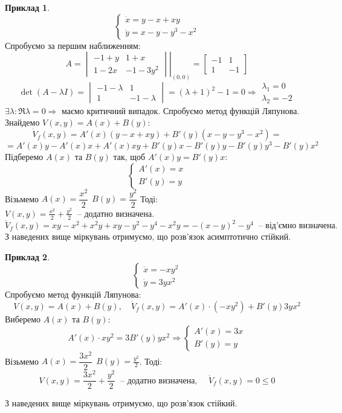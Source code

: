 \documentclass[14pt,a4paper]{scrartcl}
\theoremstyle{definition}
\newtheorem*{example}{Приклад}
\theoremstyle{definition}
\theoremstyle{definition}
\begin{document}
\begin{example}
 $$
 \begin{cases}
\dot{x} = y-x+xy\\
\dot{y} = x-y-y^3 -x^2
 \end{cases}
 $$
 Спробуємо за першим наближенням:
 $$
 A = \left. \begin{vmatrix}
  -1+y & 1 + x \\
  1 - 2x & -1-3y^2
 \end{vmatrix} \right|_{(0,0)} = \begin{bmatrix}
  -1 & 1 \\
  1 & -1
 \end{bmatrix}
 $$
 $$
 \det(A - \lambda I) = \begin{vmatrix}
   -1 - \lambda & 1 \\
   1 & -1-\lambda
 \end{vmatrix} = (\lambda + 1)^2  - 1 = 0 \Rightarrow \begin{gathered}
  \lambda_1 = 0 \\
  \lambda_2 = -2
 \end{gathered}
 $$
 $\exists \lambda : \Re \lambda = 0 \Longrightarrow $ маємо критичний випадок. Спробуємо метод функцій Ляпунова. Знайдемо $V(x,y) = A(x) + B(y)$:
$$
\dot{V}_f (x,y) = A'(x)(y-x+xy) + B'(y) (x-y-y^3 -x^2) =
$$
$$
= A'(x)y - A'(x)x + A'(x)xy + B'(y)x - B'(y)y - B'(y)y^3 - B'(y)x^2
$$
Підберемо $A(x)$ та $B(y)$ так, щоб $
A'(x)y = B'(y)x
$:
$$
\begin{cases}
 A'(x)  = x\\
 B'(y) = y
\end{cases}
$$
Візьмемо $A(x) = \dfrac{x^2}{2}\ \  B(y) = \dfrac{y^2}{2} $ Тоді: $V(x,y) = \frac{x^2}{2} + \frac{y^2}{2} \ \text{ -- додатно визначена.}$ $$\dot{V}_f (x,y) = xy - x^2 + x^2 y  + xy - y^2 - y^4 - x^2 y = -(x-y)^2 - y^4 \ \text{ -- від'ємно визначена.} $$
З наведених вище міркувань отримуємо, що розв'язок асимптотично стійкий.
\end{example}

\begin{example}
 $$
 \begin{cases}
  \dot{x } = -xy^2\\
  \dot{y} = 3yx^2
 \end{cases}
 $$
 Спробуємо метод функцій Ляпунова:
 $$
 V(x,y) = A(x) + B(y), \quad
 \dot{V}_f (x,y) = A'(x) \cdot (-xy^2) + B'(y) 3yx^2
 $$
 Виберемо $A(x)$ та $B(y)$:
 $$
 A'(x) \cdot xy^2 = 3 B'(y) yx^2 \Longrightarrow \begin{cases}
  A'(x)  = 3x\\
  B'(y) = y
 \end{cases}
 $$
Візьмемо $A(x) = \dfrac{3x^2}{2} \ \  B(y) = \frac{y^2}{2} $. Тоді:
$$ V(x,y) = \frac{3x^2}{2} + \frac{y^2}{2}  \ \text{ -- додатно визначена, } \quad \dot{V}_f (x,y) = 0 \leq 0$$
\end{example}
З наведених вище міркувань отримуємо, що розв'язок стійкий.
\end{document}
